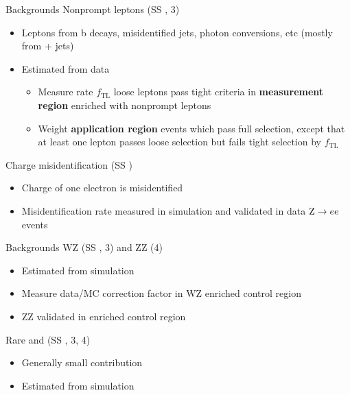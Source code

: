 \documentclass[professionalfont,fleqn]{beamer}
\begin{document}
\begin{frame}{Backgrounds}
  Nonprompt leptons (SS \ttW, 3\Plep \ttZ)
  \begin{itemize}
    \item Leptons from b decays, misidentified jets, photon conversions, etc (mostly from \ttbar + jets)
    \item Estimated from data
      \begin{itemize}
        \item Measure rate $f_\text{TL}$ loose leptons pass tight criteria in \textbf{measurement region} enriched with nonprompt leptons
        \item Weight \textbf{application region} events which pass full selection, except that at least one lepton passes loose selection but fails tight selection by $f_\text{TL}$
      \end{itemize}
  \end{itemize}
  Charge misidentification (SS \ttW)
  \begin{itemize}
    \item Charge of one electron is misidentified
    \item Misidentification rate measured in simulation and validated in data $\text{Z} \rightarrow ee$ events
  \end{itemize}
\end{frame}

\begin{frame}{Backgrounds}
  WZ (SS \ttW, 3\Plep \ttZ) and ZZ (4\Plep \ttZ)
  \begin{itemize}
    \item Estimated from simulation
    \item Measure data/MC correction factor in WZ enriched control region
    \item ZZ validated in enriched control region
  \end{itemize}
  Rare and \ttX (SS \ttW, 3\Plep \ttZ, 4\Plep \ttZ)
  \begin{itemize}
    \item Generally small contribution
    \item Estimated from simulation
  \end{itemize}
\end{frame}
\end{document}
